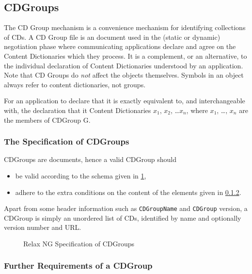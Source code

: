 \subsection{CDGroups}\label{ssec_cdgroups}

The CD Group mechanism is a convenience mechanism for identifying collections of CDs.  A
CD Group file is an \XML document used in the (static or dynamic) negotiation phase where
communicating applications declare and agree on the Content Dictionaries which they
process.  It is a complement, or an alternative, to the individual declaration of Content
Dictionaries understood by an application.  Note that CD Groups do \emph{not} affect the
\OM objects themselves.  Symbols in an object always refer to content dictionaries, not
groups.

For an application to declare that it  is exactly
equivalent to, and interchangeable with, the declaration that it 
Content Dictionaries $x_1$, $x_2$, \ldots $x_n$, where $x_1$, \ldots, $x_n$ are the
members of CDGroup G.

\subsubsection{The Specification of CDGroups}\label{sec_dtd_cdg}

CDGroups are \XML documents, hence  a valid  CDGroup
 should 
\begin{itemize}
\item be valid according to the schema given in \ref{fig_cdgroup.dtd},
\item adhere to the extra conditions on the content of the elements
  given in \ref{sect_cdgpcdata}.
\end{itemize}

Apart from some header information such as \lstinline|CDGroupName| and
\lstinline|CDGroup| version, a CDGroup is simply an unordered list of
CDs, identified by name and optionally version number and URL.

\begin{figure}\centering
  
  \caption{Relax NG Specification of CDGroups}\label{fig_cdgroup.dtd}
\end{figure}


\subsubsection{Further Requirements of a CDGroup}\label{sect_cdgpcdata}

